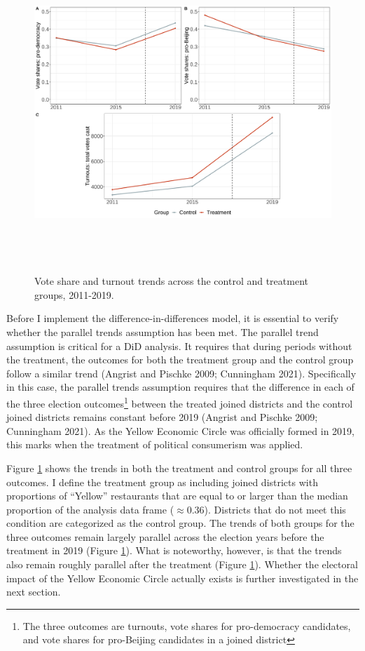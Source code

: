 \documentclass[letterpaper, 12pt]{article}
\begin{document}
\begin{figure}[!h]
    \centering
    \includegraphics[width=16cm, height=12cm]{Visuals/parallel-trends-1.pdf}
    \caption{Vote share and turnout trends across the  control and treatment groups, 2011-2019.}
    \label{fig:paraltrends}
\end{figure}

Before I implement the difference-in-differences model, it is essential to verify whether the parallel trends assumption has been met. The parallel trend assumption is critical for a DiD analysis. It requires that during periods without the treatment, the outcomes for both the treatment group and the control group follow a similar trend  (Angrist and Pischke 2009; Cunningham 2021). Specifically in this case, the parallel trends assumption requires that the difference in each of the three election outcomes\footnote{The three outcomes are turnouts, vote shares for pro-democracy candidates, and vote shares for pro-Beijing candidates in a joined district} between the treated joined districts and the control joined districts remains constant before 2019 (Angrist and Pischke 2009; Cunningham 2021). As the Yellow Economic Circle was officially formed in 2019, this marks when the treatment of political consumerism was applied. 

Figure \ref{fig:paraltrends} shows the trends in both the treatment and control groups for all three outcomes. I define the treatment group as including joined districts with proportions of ``Yellow'' restaurants that are equal to or larger than the median proportion of the analysis data frame ($\approx 0.36$). Districts that do not meet this condition are categorized as the control group. The trends of both groups for the three outcomes remain largely parallel across the election years before the treatment in 2019 (Figure \ref{fig:paraltrends}). What is noteworthy, however, is that the trends also remain roughly parallel after the treatment (Figure \ref{fig:paraltrends}). Whether the electoral impact of the Yellow Economic Circle actually exists is further investigated in the next section.
\end{document}
